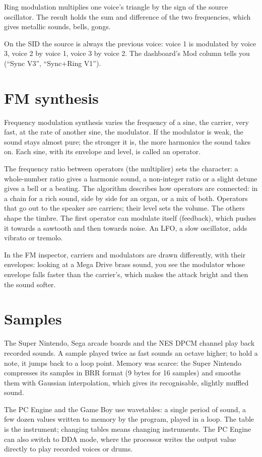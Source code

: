 Ring modulation multiplies one voice's triangle by the sign of the source oscillator. The result holds the sum and
difference of the two frequencies, which gives metallic sounds, bells, gongs.

On the SID the source is always the previous voice: voice 1 is modulated by voice 3, voice 2 by voice 1, voice 3 by
voice 2. The dashboard's Mod column tells you (``Sync V3'', ``Sync+Ring V1'').

\section{FM synthesis}
Frequency modulation synthesis varies the frequency of a sine, the carrier, very fast, at the rate of another sine,
the modulator. If the modulator is weak, the sound stays almost pure; the stronger it is, the more harmonics the
sound takes on. Each sine, with its envelope and level, is called an operator.

The frequency ratio between operators (the multiplier) sets the character: a whole-number ratio gives a harmonic
sound, a non-integer ratio or a slight detune gives a bell or a beating. The algorithm describes how operators are
connected: in a chain for a rich sound, side by side for an organ, or a mix of both. Operators that go out to the
speaker are carriers; their level sets the volume. The others shape the timbre. The first operator can modulate
itself (feedback), which pushes it towards a sawtooth and then towards noise. An LFO, a slow oscillator, adds vibrato
or tremolo.

In the \soft FM inspector, carriers and modulators are drawn differently, with their envelopes: looking at a Mega
Drive brass sound, you see the modulator whose envelope falls faster than the carrier's, which makes the attack
bright and then the sound softer.

\section{Samples}
The Super Nintendo, Sega arcade boards and the NES DPCM channel play back recorded sounds. A sample played twice as
fast sounds an octave higher; to hold a note, it jumps back to a loop point. Memory was scarce: the Super Nintendo
compresses its samples in BRR format (9 bytes for 16 samples) and smooths them with Gaussian interpolation, which
gives its recognisable, slightly muffled sound.

The PC Engine and the Game Boy use wavetables: a single period of sound, a few dozen values written to memory by the
program, played in a loop. The table is the instrument; changing tables means changing instruments. The PC Engine
can also switch to DDA mode, where the processor writes the output value directly to play recorded voices or drums.

